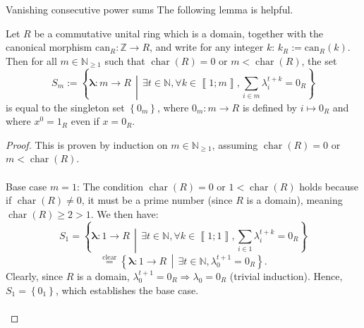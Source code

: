 \begin{appendixitem}{Vanishing consecutive power sums}
    The following lemma is helpful.
    \begin{lemma}
        Let \( R \) be a commutative unital ring which is a domain, together with the canonical morphism \( \mathrm{can}_R \colon \mathbb{Z} \to R \), and write for any integer \( k \): \( k_R := \mathrm{can}_R\left(k\right) \). Then for all \( m \in \mathbb{N}_{\geq 1} \) such that \( \operatorname{char}\left(R\right) = 0 \) or \( m < \operatorname{char}\left(R\right) \), the set
        \[
            S_m := \left\{ \boldsymbol{\lambda} \colon m \to R \,\middle|\, \exists t \in \mathbb{N}, \forall k \in \left\llbracket 1;m \right\rrbracket, \sum_{i \in m} \lambda_i^{t+k} = 0_{R} \right\}
        \]
        is equal to the singleton set \( \left\{0_m\right\} \), where \( 0_m \colon m \to R \) is defined by \( i \mapsto 0_{R} \) and where \( x^0 = 1_R \) even if \( x = 0_R \).
    \end{lemma}
    \begin{proof}
        This is proven by induction on \( m \in \mathbb{N}_{\geq 1} \), assuming \( \operatorname{char}\left(R\right) = 0 \) or \( m < \operatorname{char}\left(R\right) \).
        \\\\
        Base case \( m = 1 \): The condition \( \operatorname{char}\left(R\right) = 0 \) or \( 1 < \operatorname{char}\left(R\right) \) holds because if \( \operatorname{char}\left(R\right) \neq 0 \), it must be a prime number (since \( R \) is a domain), meaning \( \operatorname{char}\left(R\right) \geq 2 > 1 \). We then have:
        \[
            S_1 = \left\{ \boldsymbol{\lambda} \colon 1 \to R \,\middle|\, \exists t \in \mathbb{N}, \forall k \in \left\llbracket 1;1 \right\rrbracket, \sum_{i \in 1} \lambda_i^{t+k} = 0_{R} \right\}
        \]
        \[
            \overset{\text{clear}}{=} \left\{ \boldsymbol{\lambda} \colon 1 \to R \,\middle|\, \exists t \in \mathbb{N}, \lambda_0^{t+1} = 0_{R} \right\}.
        \]
        Clearly, since \( R \) is a domain, \( \lambda_0^{t+1} = 0_{R} \Rightarrow \lambda_0 = 0_{R} \) (trivial induction). Hence, \( S_1 = \left\{0_1\right\} \), which establishes the base case.
        \\\\

\end{proof}
\end{appendixitem}
